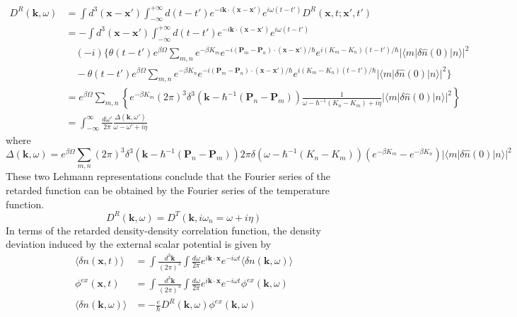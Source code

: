 \begin{equation}
\begin{aligned}
D^R(\mathbf k,\omega)&=\int d^3(\mathbf x-\mathbf x')\int_{-\infty}^{+\infty}d(t-t')e^{-i\mathbf k\cdot(\mathbf x-\mathbf x')}e^{i\omega (t-t')}D^R(\mathbf x,t;\mathbf x',t')\\
&=-\int d^3(\mathbf x-\mathbf x')\int_{-\infty}^{+\infty}d(t-t')e^{-i\mathbf k\cdot(\mathbf x-\mathbf x')}e^{i\omega (t-t')}\\
&\quad (-i)\Big\{ \theta(t-t') e^{\beta\Omega} \sum_{m,n}e^{-\beta K_m} e^{-i(\mathbf P_m-\mathbf P_n)\cdot(\mathbf x-\mathbf x')/\hbar} e^{i(K_m-K_n)(t-t')/\hbar} |\langle m|\delta\hat n(0)|n\rangle|^2\\
& \quad-\theta(t-t') e^{\beta\Omega} \sum_{m,n}e^{-\beta K_n} e^{-i(\mathbf P_m-\mathbf P_n)\cdot(\mathbf x-\mathbf x')/\hbar} e^{i(K_m-K_n)(t-t')/\hbar} |\langle m|\delta\hat n(0)|n\rangle|^2\Big\}\\
&=e^{\beta\Omega} \sum_{m,n}\left\{ e^{-\beta K_m} (2\pi)^3 \delta^3(\mathbf k-\hbar^{-1}(\mathbf P_n-\mathbf P_m))\frac{1}{\omega-\hbar^{-1}(K_n-K_m)+i\eta}|\langle m|\delta \hat n(0)|n\rangle|^2\right\}\\
&=\int_{-\infty}^{\infty}\frac{d\omega'}{2\pi}\frac{\Delta(\mathbf k,\omega')}{\omega-\omega'+i\eta}
\end{aligned}
\end{equation}
where
\begin{equation}
\Delta(\mathbf k,\omega)=e^{\beta\Omega}\sum_{m,n} (2\pi)^3 \delta^3(\mathbf k-\hbar^{-1}(\mathbf P_n-\mathbf P_m)) 2\pi\delta(\omega-\hbar^{-1}(K_n-K_m))(e^{-\beta K_m}-e^{-\beta K_n}) |\langle m|\delta \hat n(0)|n\rangle|^2
\end{equation}
 These two Lehmann representations conclude that the Fourier series of the retarded function can be obtained by the Fourier series of the temperature function.
\begin{equation}\label{eq4.9.9}
D^R(\mathbf k,\omega)=D^T(\mathbf k,i\omega_n=\omega+i\eta)
\end{equation}
 In terms of the retarded density-density correlation function, the density deviation induced by the external scalar potential is given by
\begin{equation}\label{eq4.9.10}
\begin{aligned}
\langle \delta n(\mathbf x,t)\rangle &=\int \frac{d^3\mathbf k}{(2\pi)^3}\int \frac{d\omega}{2\pi} e^{i\mathbf k\cdot \mathbf x}e^{-i\omega t}\langle \delta n(\mathbf k,\omega)\rangle\\
\phi ^{ex}(\mathbf x,t)&=\int \frac{d^3\mathbf k}{(2\pi)^3}\int \frac{d\omega}{2\pi} e^{i\mathbf k\cdot \mathbf x}e^{-i\omega t} \phi ^{ex}(\mathbf k,\omega)\\
\langle \delta n(\mathbf k,\omega)\rangle&=-\frac{e}{\hbar}D^R(\mathbf k,\omega)\phi^{ex}(\mathbf k,\omega)
\end{aligned}
\end{equation}
